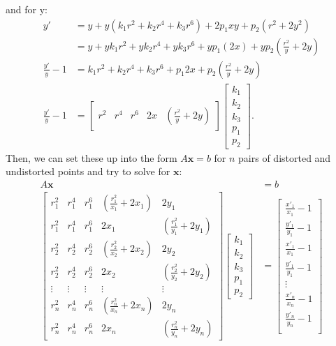 \documentclass[11pt, letterpaper]{extarticle} %
\begin{document}
and for y:
\begin{align}
    \nonumber y' &= y + y(k_1 r^2 + k_2 r^4 + k_3 r^6) + 2 p_1 xy + p_2 (r^2 + 2y^2) \\
    \nonumber    &= y + y k_1 r^2 + y k_2 r^4 + y k_3 r^6 + y p_1 (2x) + y p_2 \left(\frac{r^2}{y} + 2y \right)\\
    \nonumber \frac{y'}{y} - 1 &= k_1 r^2 + k_2 r^4 + k_3 r^6 + p_1 2x + p_2 \left(\frac{r^2}{y} + 2y \right)\\
    \frac{y'}{y} - 1 &=
    \begin{bmatrix}
        r^2 & r^4 & r^6 & 2x & \left(\frac{r^2}{y} + 2y \right)
    \end{bmatrix}
    \begin{bmatrix}
        k_1 \\ k_2 \\ k_3 \\ p_1 \\ p_2
    \end{bmatrix}.
\end{align}
Then, we can set these up into the form $A \mathbf{x} = b$ for $n$ pairs of distorted and undistorted points and try to solve for $\mathbf{x}$:
\begin{align}
    \nonumber A \mathbf{x} &= b \\
    \begin{bmatrix}
        r_1^2 & r_1^4 & r_1^6 & \left( \frac{r_1^2}{x_1} + 2x_1 \right) & 2y_1 \\
        r_1^2 & r_1^4 & r_1^6 & 2x_1 & \left( \frac{r_1^2}{y_1} + 2y_1 \right) \\
        r_2^2 & r_2^4 & r_2^6 & \left( \frac{r_2^2}{x_2} + 2x_2 \right) & 2y_2 \\
        r_2^2 & r_2^4 & r_2^6 & 2x_2 & \left( \frac{r_2^2}{y_2} + 2y_2 \right) \\
        \vdots & \vdots & \vdots & \vdots & \vdots \\
        r_n^2 & r_n^4 & r_n^6 & \left( \frac{r_n^2}{x_n} + 2x_n \right) & 2y_n \\
        r_n^2 & r_n^4 & r_n^6 & 2x_n & \left( \frac{r_n^2}{y_n} + 2y_n \right)
    \end{bmatrix}
    \begin{bmatrix}
        k_1 \\ k_2 \\ k_3 \\ p_1 \\ p_2
    \end{bmatrix}
    &=
    \begin{bmatrix}
        \frac{x'_1}{x_1} - 1 \\
        \frac{y'_1}{y_1} - 1 \\
        \frac{x'_1}{x_1} - 1 \\
        \frac{y'_1}{y_1} - 1 \\
        \vdots \\
        \frac{x'_n}{x_n} - 1 \\
        \frac{y'_n}{y_n} - 1 \\
    \end{bmatrix}
\end{align}
\end{document}
